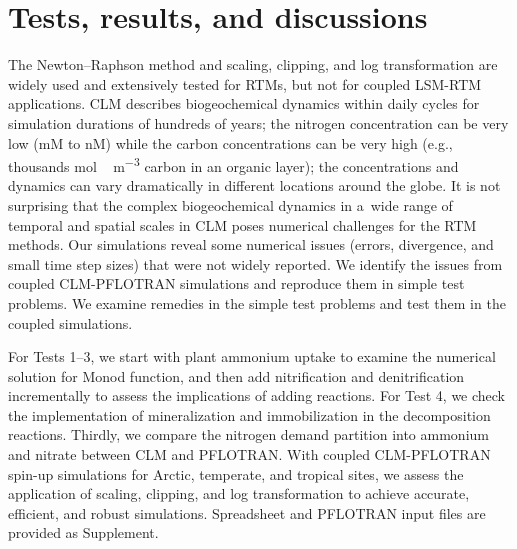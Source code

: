\documentclass[gmdd, online, hvmath]{copernicus}
\begin{document}
\section{Tests, results, and discussions}%

      The Newton--Raphson method and scaling, clipping, and log
      transformation are widely used and extensively tested for RTMs, but
      not for coupled LSM-RTM applications. CLM describes biogeochemical
      dynamics within daily cycles for simulation durations of hundreds of
      years; the nitrogen concentration can be very low (\unit{mM} to
      \unit{nM}) while the carbon concentrations can be very high (e.g.,
      thousands \unit{mol\,m^{-3}} carbon in an organic layer); the
      concentrations and dynamics can vary dramatically in different
      locations around the globe. It is not surprising that the complex
      biogeochemical dynamics in a~wide range of temporal and spatial scales
      in CLM poses numerical challenges for the RTM methods. Our simulations
      reveal some numerical issues (errors, divergence, and small time step
      sizes) that were not widely reported. We identify the issues from
      coupled CLM-PFLOTRAN simulations and reproduce them in simple test
      problems. We examine remedies in the simple test problems and test
      them in the coupled simulations.

      For Tests 1--3, we start with plant ammonium uptake to examine the
      numerical solution for Monod function, and then add nitrification and
      denitrification incrementally to assess the implications of adding
      reactions. For Test 4, we check the implementation of mineralization
      and immobilization in the decomposition reactions. Thirdly, we compare
      the nitrogen demand partition into ammonium and nitrate between CLM
      and PFLOTRAN. With coupled CLM-PFLOTRAN spin-up simulations for
      Arctic, temperate, and tropical sites, we assess the application of
      scaling, clipping, and log transformation to achieve accurate,
      efficient, and robust simulations. Spreadsheet and PFLOTRAN input
      files are provided as Supplement.
\end{document}
